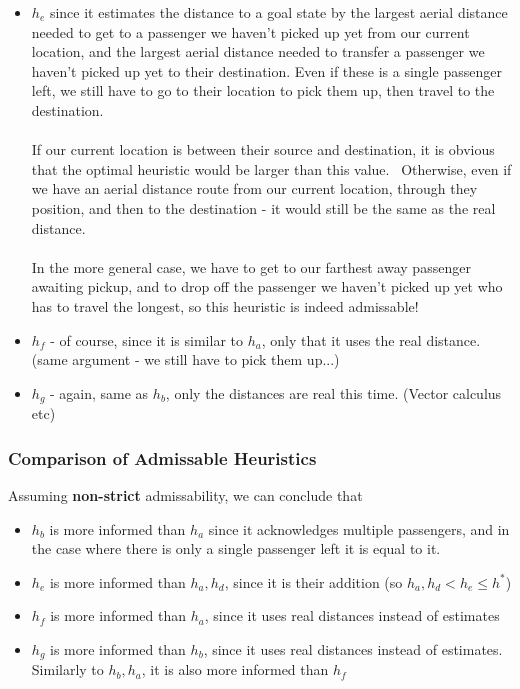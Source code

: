 \documentclass{article}
\begin{document}
\begin{itemize}
\item $h_e$ since it estimates the distance to a goal state by the largest aerial distance needed to get to a passenger we haven't picked up yet from our current location, and the largest aerial distance needed to transfer a passenger we haven't picked up yet to their destination. Even if these is a single passenger left, we still have to go to their  location to pick them up, then travel to the destination. \\~\\
If our current location is between their source and destination, it is obvious that the optimal heuristic would be larger than this value. \ 
Otherwise, even if we have an aerial distance route from our current location, through they position, and then to the destination - it would still be the same as the real distance. \\~\\
In the more general case, we have to get to our farthest away passenger awaiting pickup, and to drop off the passenger we haven't picked up yet who has to travel the longest, so this heuristic is indeed admissable!

\item $h_f$ - of course, since it is similar to $h_a$, only that it uses the real distance. (same argument - we still have to pick them up...)

\item $h_g$ - again, same as $h_b$, only the distances are real this time. (Vector calculus etc)

\end{itemize}

\subsubsection*{Comparison of Admissable Heuristics}
Assuming \textbf{non-strict} admissability, we can conclude that
\begin{itemize}
	\item $h_b$ is more informed than $h_a$ since it acknowledges multiple passengers, and in the case where there is only a single passenger left it is equal to it.
	\item $h_e$ is more informed than $h_a, h_d$, since it is their addition (so $h_a, h_d < h_e \leq h^*$)
	\item $h_f$ is more informed than $h_a$, since it uses real distances instead of estimates
	\item $h_g$ is more informed than $h_b$, since it uses real distances instead of estimates. Similarly to $h_b, h_a$, it is also more informed than $h_f$
\end{itemize}
\end{document}
